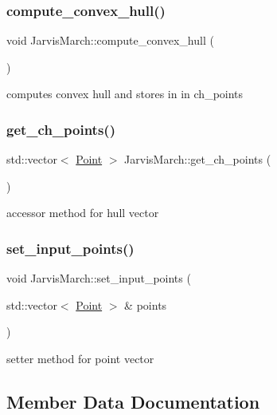 \subsubsection{\texorpdfstring{compute\_convex\_hull()}{compute\_convex\_hull()}}
{\footnotesize\ttfamily void Jarvis\+March\+::compute\+\_\+convex\+\_\+hull (\begin{DoxyParamCaption}{ }\end{DoxyParamCaption})}

computes convex hull and stores in in ch\+\_\+points \mbox{\label{class_jarvis_march_ae07fa1d85d5be1e876baa79a0a15e6bf}} 
\subsubsection{\texorpdfstring{get\_ch\_points()}{get\_ch\_points()}}
{\footnotesize\ttfamily std\+::vector$<$ \mbox{\hyperlink{class_point}{Point}} $>$ Jarvis\+March\+::get\+\_\+ch\+\_\+points (\begin{DoxyParamCaption}{ }\end{DoxyParamCaption})}

accessor method for hull vector \mbox{\label{class_jarvis_march_a53ff2d27872fa533efb2ce222a9dde88}} 
\subsubsection{\texorpdfstring{set\_input\_points()}{set\_input\_points()}}
{\footnotesize\ttfamily void Jarvis\+March\+::set\+\_\+input\+\_\+points (\begin{DoxyParamCaption}\item[{std\+::vector$<$ \mbox{\hyperlink{class_point}{Point}} $>$ \&}]{points }\end{DoxyParamCaption})}

setter method for point vector 

\subsection{Member Data Documentation}
\mbox{\label{class_jarvis_march_a6fb3af00dde6115578e1accc2e8b953c}} 
